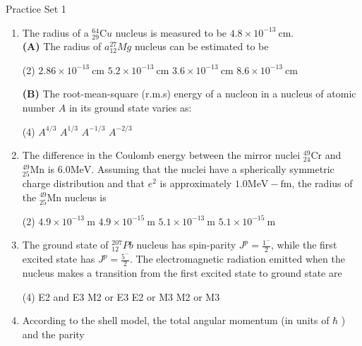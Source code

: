 \newpage
\begin{abox}
	Practice Set 1 
\end{abox}
\begin{enumerate}
	\item  The radius of a ${ }_{29}^{64} \mathrm{C} u$ nucleus is measured to be $4.8 \times 10^{-13} \mathrm{~cm}$.\\
	\textbf{(A)} The radius of $a{ }_{12}^{27} M g$ nucleus can be estimated to be
	{	}
	\begin{tasks}(2)
		\task[\textbf{A.}] $2.86 \times 10^{-13} \mathrm{~cm}$
		\task[\textbf{B.}] $5.2 \times 10^{-13} \mathrm{~cm}$
		\task[\textbf{C.}] $3.6 \times 10^{-13} \mathrm{~cm}$
		\task[\textbf{D.}] $8.6 \times 10^{-13} \mathrm{~cm}$
	\end{tasks}
	\textbf{(B)} The root-mean-square (r.m.s) energy of a nucleon in a nucleus of atomic number $A$ in its ground state varies as:
	\begin{tasks}(4)
		\task[\textbf{A.}] $A^{4 / 3}$
		\task[\textbf{B.}] $A^{1 / 3}$
		\task[\textbf{C.}] $A^{-1 / 3}$
		\task[\textbf{D.}] $A^{-2 / 3}$
	\end{tasks}
	\item The difference in the Coulomb energy between the mirror nuclei ${ }_{24}^{49} \mathrm{Cr}$ and ${ }_{25}^{49} \mathrm{Mn}$ is $6.0 \mathrm{MeV}$. Assuming that the nuclei have a spherically symmetric charge distribution and that $e^{2}$ is approximately $1.0 \mathrm{MeV}-\mathrm{fm}$, the radius of the ${ }_{25}^{49} \mathrm{Mn}$ nucleus is
	{}
	\begin{tasks}(2)
		\task[\textbf{A.}] $4.9 \times 10^{-13} \mathrm{~m}$
		\task[\textbf{B.}] $4.9 \times 10^{-15} \mathrm{~m}$
		\task[\textbf{C.}] $5.1 \times 10^{-13} \mathrm{~m}$
		\task[\textbf{D.}] $5.1 \times 10^{-15} \mathrm{~m}$
	\end{tasks}
	\item The ground state of ${ }_{12}^{207} P b$ nucleus has spin-parity $J^{p}=\frac{1^{-}}{2}$, while the first excited state has $J^{p}=\frac{5^{-}}{2}$. The electromagnetic radiation emitted when the nucleus makes a transition from the first excited state to ground state are
	{}
	\begin{tasks}(4)
		\task[\textbf{A.}] E2 and E3
		\task[\textbf{B.}] M2 or E3
		\task[\textbf{C.}] E2 or M3
		\task[\textbf{D.}] M2 or M3
	\end{tasks}	
	\item According to the shell model, the total angular momentum (in units of $\hbar$ ) and the parity

\end{enumerate}
